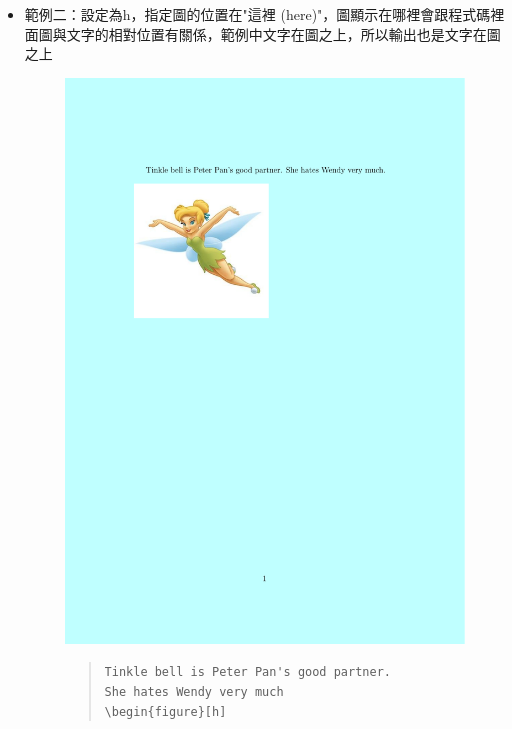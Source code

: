 \documentclass[12pt,a4paper]{report}
\begin{document}
\begin{CJK}{UTF8}{bkai}
\begin{itemize}
\item 範例二：設定為h，指定圖的位置在"這裡 (here)"，圖顯示在哪裡會跟程式碼裡面圖與文字的相對位置有關係，範例中文字在圖之上，所以輸出也是文字在圖之上
\begin{figure}[!h] 
\begin{minipage}[b]{0.5\textwidth} 
\centering 
\includegraphics[scale=0.3]{./pics/float_example_7.pdf} 
\end{minipage}%
\begin{minipage}[b]{0.5\textwidth} 
\begin{footnotesize}
\begin{quote}
\begin{verbatim}
Tinkle bell is Peter Pan's good partner. 
She hates Wendy very much
\begin{figure}[h]

\end{verbatim}
\end{quote}
\end{footnotesize}
\end{minipage}
\end{figure}
\end{itemize}
\end{CJK}
\end{document}
